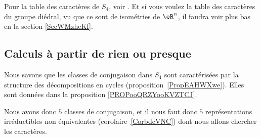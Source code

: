 Pour la table des caractères de \( S_4\), voir \cite{KXjFWKA}. Et si vous voulez la table des caractères du groupe diédral, vu que ce sont de isométries de \( \eR^n\), il faudra voir plus bas en la section \ref{SecWMzheKf}.

\subsection{Calculs à partir de rien ou presque}

Nous savons que les classes de conjugaison dans \( S_4\) sont caractérisées par la structure des décompositions en cycles (proposition~\ref{PropEAHWXwe}). Elles sont données dans la proposition \ref{PROPooQRZYooKVZTCJ}.

Nous avons donc \( 5\) classes de conjugaison, et il nous faut donc \( 5\) représentations irréductibles non équivalentes (corolaire~\ref{CorbdcVNC}) dont nous allons chercher les caractères.

